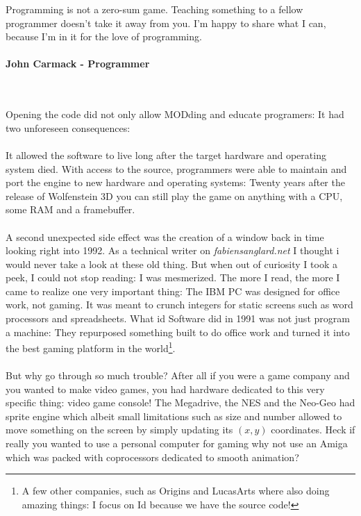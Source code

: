  \begin{fancyquotes}
   Programming is not a zero-sum game. Teaching something to a fellow programmer doesn't take it away from you. I'm happy to share what I can, because I'm in it for the love of programming.\\
   \\
\textbf{John Carmack - Programmer}
 \end{fancyquotes}\\
\\
Opening the code did not only allow MODding and educate programers: It had two unforeseen consequences:\\
\\
It allowed the software to live long after the target hardware and operating system died. With access to the source, programmers were able to maintain and port the engine to new hardware and operating systems: Twenty years after the release of Wolfenstein 3D you can still play the game on anything with a CPU, some RAM and a framebuffer. \\
\\
A second unexpected side effect was the creation of a window back in time looking right into 1992. As a technical writer on \emph{fabiensanglard.net} I thought i would never take a look at these old thing. But when out of curiosity I took a peek, I could not stop reading: I was mesmerized. The more I read, the more I came to realize one very important thing: The IBM PC was designed for office work, not gaming. It was meant to crunch integers for static screens such as word processors and spreadsheets. What id Software did in 1991 was not just program a machine: They repurposed something built to do office work and turned it into the best gaming platform in the world\footnote{A few other companies, such as Origins and LucasArts where also doing amazing things: I focus on Id because we have the source code!}.\\
\\
But why go through so much trouble? After all if you were a game company and you wanted to make video games, you had hardware dedicated to this very specific thing: video game console! The Megadrive, the NES and the Neo-Geo had sprite engine which albeit small limitations such as size and number allowed to move something on the screen by simply updating its $(x,y)$ coordinates. Heck if really you wanted to use a personal computer for gaming why not use an Amiga which was packed with coprocessors dedicated to smooth animation?\\
